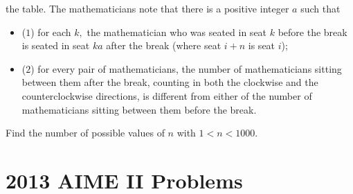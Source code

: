 \documentclass{article}
\begin{document}
\begin{enumerate}[label=\arabic*., itemsep=0.5em]
the table. The mathematicians note that there is a positive integer \(a\) such that

\begin{itemize}
\item (\(1\)) for each \(k,\) the mathematician who was seated in seat \(k\) before the break is seated in seat \(ka\) after the break (where seat \(i + n\) is seat \(i\));
\end{itemize}


\begin{itemize}
\item (\(2\)) for every pair of mathematicians, the number of mathematicians sitting between them after the break, counting in both the clockwise and the counterclockwise directions, is different from either of the number of mathematicians sitting between them before the break.
\end{itemize}


Find the number of possible values of \(n\) with \(1 < n < 1000.\)\par \vspace{0.5em}\end{enumerate}\newpage\section*{2013 AIME II Problems}
\end{document}
